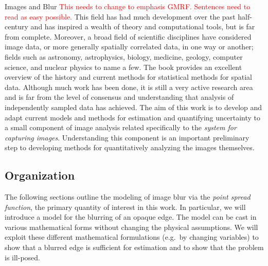 \begin{chapter}{Images and Blur}
  \textcolor{red}{
  This needs to change to emphasis GMRF.
  Sentences need to read as easy possible.
  }
  This field has had much development over the past half-century and has inspired a wealth of theory and computational tools, but is far from complete.
  Moreover, a broad field of scientific disciplines have considered image data, or more generally spatially correlated data, in one way or another; fields such as astronomy, astrophysics, biology, medicine, geology, computer science, and nuclear physics to name a few.
  The book \citep{cressie1993statistics} provides an excellent overview of the history and current methods for statistical methods for spatial data.
  Although much work has been done, it is still a very active research area and is far from the level of consensus and understanding that analysis of independently sampled data has achieved. 
  The aim of this work is to develop and adapt current models and methods for estimation and quantifying uncertainty to a small component of image analysis related specifically to the \emph{system for capturing images}.
  Understanding this component is an important preliminary step to developing methods for quantitatively analyzing the images themselves.

\subsection{Organization}
  The following sections outline the modeling of image blur via the \emph{point spread function}, the primary quantity of interest in this work.
  In particular, we will introduce a model for the blurring of an opaque edge. 
  The model can be cast in various mathematical forms without changing the physical assumptions.
  We will exploit these different mathematical formulations (e.g.~by changing variables) to show that a blurred edge is sufficient for estimation and to show that the problem is ill-posed.



\end{chapter}
